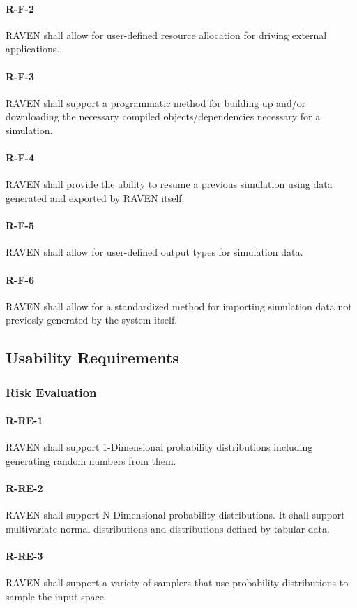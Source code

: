 \paragraph{R-F-2} 
RAVEN shall allow for user-defined resource allocation for driving external applications.
\paragraph{R-F-3} 
RAVEN shall support a programmatic method for building up and/or downloading the necessary compiled objects/dependencies necessary for a simulation.
\paragraph{R-F-4} 
RAVEN shall provide the ability to resume a previous simulation using data generated and exported by RAVEN itself.
\paragraph{R-F-5} 
RAVEN shall allow for user-defined output types for simulation data.
\paragraph{R-F-6} 
RAVEN shall allow for a standardized method for importing simulation data not previosly generated by the system itself.
\subsection{Usability Requirements}
\subsubsection{Risk Evaluation}
\paragraph{R-RE-1} 
RAVEN shall support 1-Dimensional probability distributions including generating random numbers from them.
\paragraph{R-RE-2} 
RAVEN shall support N-Dimensional probability distributions. It shall support multivariate normal distributions and distributions defined by tabular data.
\paragraph{R-RE-3} 
RAVEN shall support a variety of samplers that use probability distributions to sample the input space.
